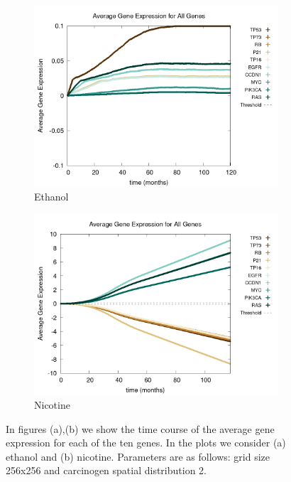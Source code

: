 \documentclass[\main/thesis.tex]{subfiles}
\begin{document}
\begin{figure}[H]
    \centering
    \begin{subfigure}[t]{.6\textwidth}
      \centering
      \includegraphics[width=\textwidth]{images/4_CarcinFunc/Fig7/geneExprAll_all_Carcin0.png}
      \caption{Ethanol}
      \label{fig:CarcinFunc_geneExpr_Carcin0}
    \end{subfigure}
    \begin{subfigure}[t]{.6\textwidth}
      \centering
      \includegraphics[width=\textwidth]{images/4_CarcinFunc/Fig7/geneExprAll_all_Carcin1.png}
      \caption{Nicotine}
      \label{fig:CarcinFunc_geneExpr_Carcin1}
    \end{subfigure}
    \caption{In figures (a),(b) we show the time course of the average gene expression for each of the ten genes. In the plots we consider (a) ethanol and (b) nicotine. Parameters are as follows: grid size 256x256 and carcinogen spatial distribution 2.}
    \label{fig:CarcinFunc_geneExpr_Carcins}
\end{figure}
\end{document}
